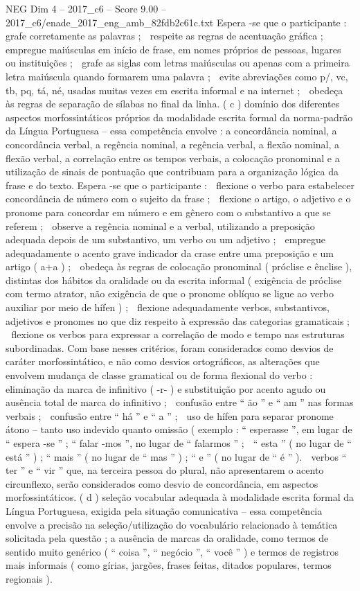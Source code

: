 \begin{textsample}{NEG Dim 4 – 2017\_c6 – Score 9.00 – 2017\_c6/enade\_2017\_eng\_amb\_82fdb2c61c.txt}
Espera -se que o participante :  grafe corretamente as palavras ;  respeite as regras de acentuação gráfica ;  empregue maiúsculas em início de frase, em nomes próprios de pessoas, lugares ou instituições ;  grafe as siglas com letras maiúsculas ou apenas com a primeira letra maiúscula quando formarem uma palavra ;  evite abreviações como p/, vc, tb, pq, tá, né, usadas muitas vezes em escrita informal e na internet ;  obedeça às regras de separação de sílabas no final da linha. ( c ) domínio dos diferentes aspectos morfossintáticos próprios da modalidade escrita formal da norma-padrão da Língua Portuguesa – essa competência envolve : a concordância nominal, a concordância verbal, a regência nominal, a regência verbal, a flexão nominal, a flexão verbal, a correlação entre os tempos verbais, a colocação pronominal e a utilização de sinais de pontuação que contribuam para a organização lógica da frase e do texto.
Espera -se que o participante :  flexione o verbo para estabelecer concordância de número com o sujeito da frase ;  flexione o artigo, o adjetivo e o pronome para concordar em número e em gênero com o substantivo a que se referem ;  observe a regência nominal e a verbal, utilizando a preposição adequada depois de um substantivo, um verbo ou um adjetivo ;  empregue adequadamente o acento grave indicador da crase entre uma preposição e um artigo ( a+a ) ;  obedeça às regras de colocação pronominal ( próclise e ênclise ), distintas dos hábitos da oralidade ou da escrita informal ( exigência de próclise com termo atrator, não exigência de que o pronome oblíquo se ligue ao verbo auxiliar por meio de hífen ) ;  flexione adequadamente verbos, substantivos, adjetivos e pronomes no que diz respeito à expressão das categorias gramaticais ;  flexione os verbos para expressar a correlação de modo e tempo nas estruturas subordinadas.
Com base nesses critérios, foram considerados como desvios de caráter morfossintático, e não como desvios ortográficos, as alterações que envolvem mudança de classe gramatical ou de forma flexional do verbo :  eliminação da marca de infinitivo ( -r- ) e substituição por acento agudo ou ausência total de marca do infinitivo ;  confusão entre “ ão ” e “ am ” nas formas verbais ;  confusão entre “ há ” e “ a ” ;  uso de hífen para separar pronome átono – tanto uso indevido quanto omissão ( exemplo : “ esperasse ”, em lugar de “ espera -se ” ; “ falar -mos ”, no lugar de “ falarmos ” ;  “ esta ” ( no lugar de “ está ” ) ; “ mais ” ( no lugar de “ mas ” ) ; “ e ” ( no lugar de “ é ” ).  verbos “ ter ” e “ vir ” que, na terceira pessoa do plural, não apresentarem o acento circunflexo, serão considerados como desvio de concordância, em aspectos morfossintáticos. ( d ) seleção vocabular adequada à modalidade escrita formal da Língua Portuguesa, exigida pela situação comunicativa – essa competência envolve a precisão na seleção/utilização do vocabulário relacionado à temática solicitada pela questão ; a ausência de marcas da oralidade, como termos de sentido muito genérico ( “ coisa ”, “ negócio ”, “ você ” ) e termos de registros mais informais ( como gírias, jargões, frases feitas, ditados populares, termos regionais ).

\end{textsample}
